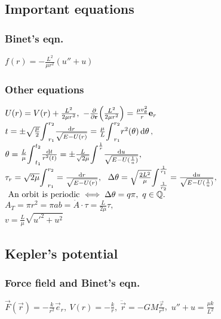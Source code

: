 \subsection{Important equations}
\subsubsection*{Binet's eqn.}
$f(r)=-\frac{L^{2}}{\mu r^{2}}(u''+u)$




\subsubsection*{Other equations}
$U(r)=V(r)+\frac{L^{2}}{2\mu r^{2}},\ -\partials{}{\vec{r}}\Big(\frac{L^{2}}{2\mu r^{2}}\Big)=\frac{\mu v_{\theta}^{2}}{r}\vec{e}_{r}$\\
$t=\pm \sqrt{\frac{\mu}{2}}\scaleint{5ex}_{r_{1}}^{r_{2}}\frac{\dd{r}}{\sqrt{E-U(r)}}=\frac{\mu}{L}\scaleint{5ex}_{r_{1}}^{r_{2}}r^{2}(\theta)\dd{\theta},$\\
$\theta=\frac{L}{\mu}\scaleint{5ex}_{t_{1}}^{t_{2}}\frac{\dd{t}}{r^{2}(t)}=\pm\frac{L}{\sqrt{2\mu}}\scaleint{5ex}^{\frac{1}{r}}\frac{\dd{u}}{\sqrt{E-U(\frac{1}{u})}},$\\
$\tau_{r}=\sqrt{2\mu}\scaleint{5ex}_{r_{1}}^{r_{2}}=\frac{\dd{r}}{\sqrt{E-U(r)}},\ $
$\Delta{\theta}=\sqrt{\frac{2L^{2}}{\mu}}\scaleint{5ex}_{\frac{1}{r_{2}}}^{\frac{1}{r_{1}}}=\frac{\dd{u}}{\sqrt{E-U(\frac{1}{u})}},$\\
$\text{ An orbit is periodic $\iff \Delta\theta=q\pi,\ q\in\mathbb{Q}$}.$\\
$A_{T}=\pi r^{2}=\pi ab=\dot{A}\cdot\tau=\frac{L}{2\mu}\tau,$\\
$v=\frac{L}{\mu}\sqrt{u'^{2}+u^{2}}$


\subsection{Kepler's potential}



\subsubsection*{Force field and Binet's eqn.}
$\vec{F}(\vec{r})=-\frac{k}{r^{2}}\vec{e}_{r},\ V(r)=-\frac{k}{r},\ \ddot{\vec{r}}=-GM\frac{\vec{r}}{r^3}$,\ 
$u''+u=\frac{\mu k}{L^{2}}$



